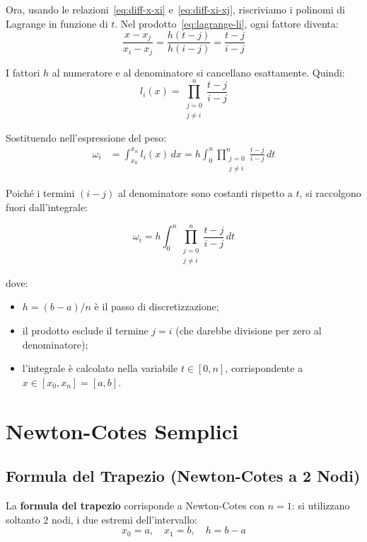 \documentclass[a4paper,12pt]{article}
\theoremstyle{definition}
\theoremstyle{remark}
\begin{document}
\noindent Ora, usando le relazioni~\eqref{eq:diff-x-xi}
e~\eqref{eq:diff-xi-xj}, riscriviamo i polinomi di Lagrange in funzione
di $t$. Nel prodotto~\eqref{eq:lagrange-li}, ogni fattore diventa:
\[
  \frac{x - x_j}{x_i - x_j} = \frac{h(t-j)}{h(i-j)} = \frac{t-j}{i-j}
\]

\noindent I fattori $h$ al numeratore e al denominatore si cancellano
esattamente. Quindi:
\[
  l_i(x) = \prod_{\substack{j=0\\j\ne i}}^{n} \frac{t-j}{i-j}
\]

Sostituendo nell'espressione del peso:
\begin{align*}
  \omega_i
  &= \int_{x_0}^{x_n} l_i(x)\,dx
   = h \int_0^n \prod_{\substack{j=0\\j\ne i}}^{n} \frac{t-j}{i-j}\,dt
\end{align*}

\noindent Poiché i termini $(i-j)$ al denominatore sono costanti rispetto
a $t$, si raccolgono fuori dall'integrale:

\begin{equation}
  \boxed{
    \omega_i = h \int_0^n \prod_{\substack{j=0\\j\ne i}}^{n}
    \frac{t-j}{i-j}\,dt
  }
  \label{eq:pesi-t}
\end{equation}

\noindent dove:
\begin{itemize}
  \item $h = (b-a)/n$ è il passo di discretizzazione;
  \item il prodotto esclude il termine $j = i$ (che darebbe divisione per
        zero al denominatore);
  \item l'integrale è calcolato nella variabile $t \in [0, n]$,
        corrispondente a $x \in [x_0, x_n] = [a,b]$.
\end{itemize}

\section{Newton-Cotes Semplici}

\subsection{Formula del Trapezio (Newton-Cotes a 2 Nodi)}

La \textbf{formula del trapezio} corrisponde a Newton-Cotes con $n = 1$:
si utilizzano soltanto 2 nodi, i due estremi dell'intervallo:
\[
  x_0 = a, \quad x_1 = b, \quad h = b - a
\]
\end{document}
